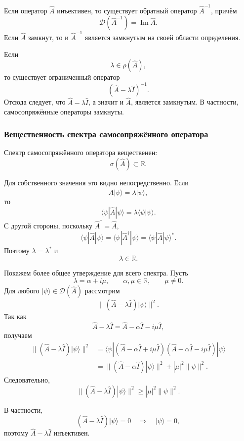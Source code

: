 \documentclass[12pt,a4paper]{article}
\begin{document}
Если оператор $\hat A$ инъективен, то существует обратный оператор
$\hat A^{-1}$, причём
\[
    \boxed{
        \mathcal D(\hat A^{-1})
        =
        \operatorname{Im}\hat A
    }.
\]
Если $\hat A$ замкнут, то и $\hat A^{-1}$ является замкнутым на своей
области определения.

Если
\[
    \lambda\in\rho(\hat A),
\]
то существует ограниченный оператор
\[
    (\hat A-\lambda\hat I)^{-1}.
\]
Отсюда следует, что $\hat A-\lambda\hat I$, а значит и $\hat A$,
является замкнутым. В частности, самосопряжённые операторы замкнуты.


\subsubsection{Вещественность спектра самосопряжённого оператора}

Спектр самосопряжённого оператора вещественен:
\[
    \boxed{
        \sigma(\hat A)\subset\mathbb R
    }.
\]

Для собственного значения это видно непосредственно. Если
\[
    \hat A|\psi\rangle
    =
    \lambda|\psi\rangle,
\]
то
\[
    \langle\psi|\hat A|\psi\rangle
    =
    \lambda\langle\psi|\psi\rangle.
\]
С другой стороны, поскольку $\hat A^\dagger=\hat A$,
\[
    \langle\psi|\hat A|\psi\rangle
    =
    \langle\psi|\hat A^\dagger|\psi\rangle
    =
    \langle\psi|\hat A|\psi\rangle^*.
\]
Поэтому $\lambda=\lambda^*$ и
\[
    \lambda\in\mathbb R.
\]

Покажем более общее утверждение для всего спектра. Пусть
\[
    \lambda=\alpha+i\mu,
    \qquad
    \alpha,\mu\in\mathbb R,
    \qquad
    \mu\neq0.
\]
Для любого $|\psi\rangle\in\mathcal D(\hat A)$ рассмотрим
\[
    \|(\hat A-\lambda\hat I)|\psi\rangle\|^2.
\]
Так как
\[
    \hat A-\lambda\hat I
    =
    \hat A-\alpha\hat I-i\mu\hat I,
\]
получаем
\begin{align*}
    \|(\hat A-\lambda\hat I)|\psi\rangle\|^2
    &=
    \langle\psi|
    (\hat A-\alpha\hat I+i\mu\hat I)
    (\hat A-\alpha\hat I-i\mu\hat I)
    |\psi\rangle \\
    &=
    \|(\hat A-\alpha\hat I)|\psi\rangle\|^2
    +
    |\mu|^2\|\psi\|^2.
\end{align*}
Следовательно,
\[
    \boxed{
    \|(\hat A-\lambda\hat I)|\psi\rangle\|^2
    \geq
    |\mu|^2\|\psi\|^2
    }.
\]

В частности,
\[
    (\hat A-\lambda\hat I)|\psi\rangle=0
    \quad\Longrightarrow\quad
    |\psi\rangle=0,
\]
поэтому $\hat A-\lambda\hat I$ инъективен.
\end{document}

